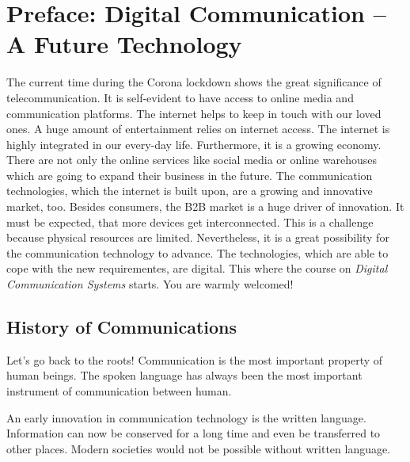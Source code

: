 {}
\chapter*{Preface: Digital Communication -- A Future Technology}

\begin{refsection}

The current time during the Corona lockdown shows the great significance of telecommunication. It is self-evident to have access to online media and communication platforms. The internet helps to keep in touch with our loved ones. A huge amount of entertainment relies on internet access. The internet is highly integrated in our every-day life. Furthermore, it is a growing economy. There are not only the online services like social media or online warehouses which are going to expand their business in the future. The communication technologies, which the internet is built upon, are a growing and innovative market, too. Besides consumers, the \ac{B2B} market is a huge driver of innovation. It must be expected, that more devices get interconnected. This is a challenge because physical resources are limited. Nevertheless, it is a great possibility for the communication technology to advance. The technologies, which are able to cope with the new requirementes, are digital. This where the course on \emph{Digital Communication Systems} starts. You are warmly welcomed!

\section*{History of Communications}

Let's go back to the roots! Communication is the most important property of human beings. The spoken language has always been the most important instrument of communication between human.

An early innovation in communication technology is the written language. Information can now be conserved for a long time and even be transferred to other places. Modern societies would not be possible without written language.


\end{refsection}
